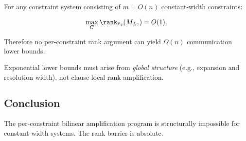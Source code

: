 For any constraint system consisting of $m=O(n)$
constant-width constraints:

\[
\max_{C} \rank_{\mathbb{F}_2}(M_{f_C}) = O(1).
\]

Therefore no per-constraint rank argument
can yield $\Omega(n)$ communication lower bounds.

Exponential lower bounds must arise from
\emph{global structure} (e.g., expansion and resolution width),
not clause-local rank amplification.

\subsection{Conclusion}

The per-constraint bilinear amplification program
is structurally impossible for constant-width systems.
The rank barrier is absolute.
